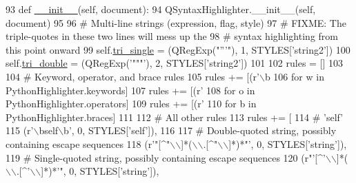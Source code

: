 \begin{DoxyCode}
93     \textcolor{keyword}{def }\hyperlink{classsoftware_1_1chipwhisperer_1_1analyzer_1_1utils_1_1syntaxhighlighter_1_1PythonHighlighter_a8c04cc586167fb82a4b0b036b7cb0f14}{\_\_init\_\_}(self, document):
94         QSyntaxHighlighter.\_\_init\_\_(self, document)
95 
96         \textcolor{comment}{# Multi-line strings (expression, flag, style)}
97         \textcolor{comment}{# FIXME: The triple-quotes in these two lines will mess up the}
98         \textcolor{comment}{# syntax highlighting from this point onward}
99         self.\hyperlink{classsoftware_1_1chipwhisperer_1_1analyzer_1_1utils_1_1syntaxhighlighter_1_1PythonHighlighter_a20db7befbb80fc505e9f641ee97ea9ef}{tri\_single} = (QRegExp(\textcolor{stringliteral}{"'''"}), 1, STYLES[\textcolor{stringliteral}{'string2'}])
100         self.\hyperlink{classsoftware_1_1chipwhisperer_1_1analyzer_1_1utils_1_1syntaxhighlighter_1_1PythonHighlighter_a28f1aa6d52aab1f3ba742b8f93a9ac39}{tri\_double} = (QRegExp(\textcolor{stringliteral}{'"""'}), 2, STYLES[\textcolor{stringliteral}{'string2'}])
101 
102         rules = []
103 
104         \textcolor{comment}{# Keyword, operator, and brace rules}
105         rules += [(\textcolor{stringliteral}{r'\(\backslash\)b%
106             \textcolor{keywordflow}{for} w \textcolor{keywordflow}{in} PythonHighlighter.keywords]
107         rules += [(\textcolor{stringliteral}{r'%
108             \textcolor{keywordflow}{for} o \textcolor{keywordflow}{in} PythonHighlighter.operators]
109         rules += [(\textcolor{stringliteral}{r'%
110             \textcolor{keywordflow}{for} b \textcolor{keywordflow}{in} PythonHighlighter.braces]
111 
112         \textcolor{comment}{# All other rules}
113         rules += [
114             \textcolor{comment}{# 'self'}
115             (\textcolor{stringliteral}{r'\(\backslash\)bself\(\backslash\)b'}, 0, STYLES[\textcolor{stringliteral}{'self'}]),
116 
117             \textcolor{comment}{# Double-quoted string, possibly containing escape sequences}
118             (\textcolor{stringliteral}{r'"[^"\(\backslash\)\(\backslash\)]*(\(\backslash\)\(\backslash\).[^"\(\backslash\)\(\backslash\)]*)*"'}, 0, STYLES[\textcolor{stringliteral}{'string'}]),
119             \textcolor{comment}{# Single-quoted string, possibly containing escape sequences}
120             (\textcolor{stringliteral}{r"'[^'\(\backslash\)\(\backslash\)]*(\(\backslash\)\(\backslash\).[^'\(\backslash\)\(\backslash\)]*)*'"}, 0, STYLES[\textcolor{stringliteral}{'string'}]),
}}}
\end{DoxyCode}
